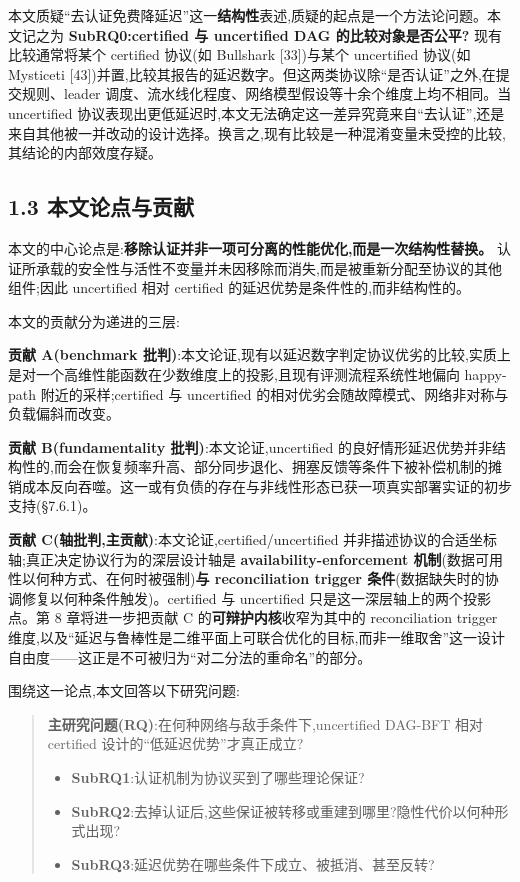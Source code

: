 \documentclass[UTF8,fontset=windows,a4paper,11pt]{ctexart}
\providecommand{\tightlist}{\setlength{\itemsep}{0pt}\setlength{\parskip}{0pt}}
\begin{document}
本文质疑``去认证免费降延迟''这一\textbf{结构性}表述,质疑的起点是一个方法论问题。本文记之为
\textbf{SubRQ0:certified 与 uncertified DAG 的比较对象是否公平?}
现有比较通常将某个 certified 协议(如 Bullshark {[}33{]})与某个
uncertified 协议(如 Mysticeti
{[}43{]})并置,比较其报告的延迟数字。但这两类协议除``是否认证''之外,在提交规则、leader
调度、流水线化程度、网络模型假设等十余个维度上均不相同。当 uncertified
协议表现出更低延迟时,本文无法确定这一差异究竟来自``去认证'',还是来自其他被一并改动的设计选择。换言之,现有比较是一种混淆变量未受控的比较,其结论的内部效度存疑。

\subsection{1.3
本文论点与贡献}\label{ux672cux6587ux8bbaux70b9ux4e0eux8d21ux732e}

本文的中心论点是:\textbf{移除认证并非一项可分离的性能优化,而是一次结构性替换。}
认证所承载的安全性与活性不变量并未因移除而消失,而是被重新分配至协议的其他组件;因此
uncertified 相对 certified 的延迟优势是条件性的,而非结构性的。

本文的贡献分为递进的三层:

\textbf{贡献 A(benchmark
批判)}:本文论证,现有以延迟数字判定协议优劣的比较,实质上是对一个高维性能函数在少数维度上的投影,且现有评测流程系统性地偏向
happy-path 附近的采样;certified 与 uncertified
的相对优劣会随故障模式、网络非对称与负载偏斜而改变。

\textbf{贡献 B(fundamentality 批判)}:本文论证,uncertified
的良好情形延迟优势并非结构性的,而会在恢复频率升高、部分同步退化、拥塞反馈等条件下被补偿机制的摊销成本反向吞噬。这一或有负债的存在与非线性形态已获一项真实部署实证的初步支持(§7.6.1)。

\textbf{贡献 C(轴批判,主贡献)}:本文论证,certified/uncertified
并非描述协议的合适坐标轴;真正决定协议行为的深层设计轴是
\textbf{availability-enforcement
机制}(数据可用性以何种方式、在何时被强制)\textbf{与 reconciliation
trigger 条件}(数据缺失时的协调修复以何种条件触发)。certified 与
uncertified
只是这一深层轴上的两个投影点。第 8 章将进一步把贡献 C 的\textbf{可辩护内核}收窄为其中的
reconciliation trigger
维度,以及``延迟与鲁棒性是二维平面上可联合优化的目标,而非一维取舍''这一设计自由度------这正是不可被归为``对二分法的重命名''的部分。

围绕这一论点,本文回答以下研究问题:

\begin{quote}
\textbf{主研究问题(RQ)}:在何种网络与敌手条件下,uncertified DAG-BFT 相对
certified 设计的``低延迟优势''才真正成立?

\begin{itemize}
\tightlist
\item
  \textbf{SubRQ1}:认证机制为协议买到了哪些理论保证?
\item
  \textbf{SubRQ2}:去掉认证后,这些保证被转移或重建到哪里?隐性代价以何种形式出现?
\item
  \textbf{SubRQ3}:延迟优势在哪些条件下成立、被抵消、甚至反转?
\end{itemize}
\end{quote}
\end{document}

